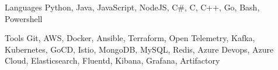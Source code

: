 
\begin{cvskills}
  \cvskill
    {Languages} %
    {Python, Java, JavaScript, NodeJS, C\#, C, C++, Go, Bash, Powershell} %
    
  \cvskill
    {Tools} %
    {Git, AWS, Docker, Ansible, Terraform, Open Telemetry, Kafka, Kubernetes, GoCD, Istio, MongoDB, MySQL, Redis, Azure Devops, Azure Cloud, Elasticsearch, Fluentd, Kibana, Grafana, Artifactory} %
\end{cvskills}
